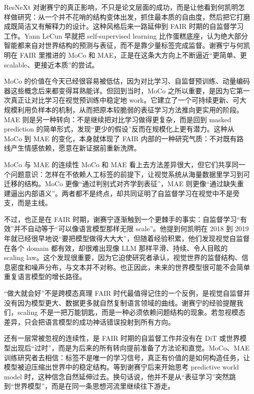 \documentclass[a4paper,12pt]{article}
\begin{document}
ResNeXt 对谢赛宁的真正影响，不只是论文层面的成功，而是让他看到何凯明怎样做研究：从一个并不花哨的结构变体出发，抓住最本质的自由度，然后把它打磨成既简洁又有解释力的设计。这种风格后来一路延伸到 FAIR 时期的自监督学习工作。Yann LeCun 早就把 self-supervised learning 比作蛋糕底座，认为绝大部分智能都来自对世界结构的预测与表征，而不是靠少量标签完成监督。谢赛宁与何凯明在 FAIR 里推进的 MoCo 和 MAE，正是在这条大方向上不断逼近“更简单、更 scalable、更接近本质”的尝试。

MoCo 的价值在今天已经很容易被低估，因为对比学习、自监督预训练、动量编码器这些概念后来都变得耳熟能详。但回到当时，MoCo 之所以重要，是因为它第一次真正让对比学习在视觉预训练中稳定地 work。它建立了一个可持续更新、可大规模利用负样本的机制，从而把原本较脆弱的表征学习方法推向更实用的阶段。MAE 则是另一种转向：不是继续把对比学习做得更复杂，而是回到 masked prediction 的简单形式，发现“更少的假设”反而在规模化上更有潜力。这种从 MoCo 到 MAE 的变化，本身就体现了 FAIR 内部的一种研究气质：不对既有路线产生情感依赖，愿意在新证据前重新洗牌。

\begin{knowledgebox}{MoCo 与 MAE 的连续性}
MoCo 和 MAE 看上去方法差异很大，但它们共享同一个问题意识：怎样在不依赖人工标签的前提下，让视觉系统从海量数据里学习到可迁移的结构。MoCo 更像“通过判别式对齐学到表征”，MAE 则更像“通过缺失重建逼出内部语义”。两者都不是终点，却共同证明了自监督学习在视觉中不是旁支，而是主线。
\end{knowledgebox}

不过，也正是在 FAIR 时期，谢赛宁逐渐触到一个更棘手的事实：自监督学习“有效”并不自动等于“可以像语言模型那样无限 scale”。他提到何凯明在 2018 到 2019 年就已经很早地说“要把模型做得大大大”，但随着经验积累，他们发现视觉自监督在各个 domain 都有效，却很难出现像 LLM 那样平滑、持续、令人目眩的 scaling law。这个发现很重要，因为它迫使研究者承认，视觉世界的监督结构、信息密度和噪声分布，与文本并不对称。也正因此，未来的世界模型很可能不会简单重复语言模型的增长路径。

\begin{warningbox}{“做大就会好”不是跨模态真理}
FAIR 时代最值得记住的一个反例，是视觉自监督并没有因为模型更大、数据更多就自然复制语言领域的曲线。谢赛宁的经验提醒我们，scaling 不是一把万能钥匙，而是一种必须依赖问题结构的现象。若忽视模态差异，只会把语言模型的成功神话错误投射到所有方向。
\end{warningbox}

还有一层常被忽视的连续性，是 FAIR 时期的自监督工作并没有在 DiT 或世界模型出现后“过时”，而是为后来的所有转向提前准备了方法论和直觉。MoCo、MAE 训练研究者去相信：标签不是唯一的学习信号，真正有价值的是如何构造任务，让模型被迫压缩出世界中的稳定结构。等到谢赛宁后来开始思考 predictive world model 时，这种信念自然延伸过去。换句话说，他并不是从“表征学习”突然跳到“世界模型”，而是在同一条思想河流里继续往下游走。
\end{document}
